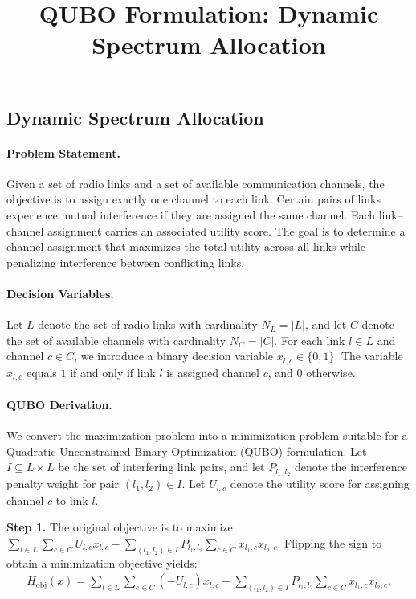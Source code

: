 \documentclass[12pt]{article}
\title{QUBO Formulation: Dynamic Spectrum Allocation}
\date{}
\begin{document}
\maketitle

\subsection*{Dynamic Spectrum Allocation}

\paragraph{Problem Statement.}
Given a set of radio links and a set of available communication channels, the objective is to assign exactly one channel to each link. Certain pairs of links experience mutual interference if they are assigned the same channel. Each link--channel assignment carries an associated utility score. The goal is to determine a channel assignment that maximizes the total utility across all links while penalizing interference between conflicting links.

\paragraph{Decision Variables.}
Let $L$ denote the set of radio links with cardinality $N_L = |L|$, and let $C$ denote the set of available channels with cardinality $N_C = |C|$. For each link $l \in L$ and channel $c \in C$, we introduce a binary decision variable $x_{l,c} \in \{0,1\}$. The variable $x_{l,c}$ equals $1$ if and only if link $l$ is assigned channel $c$, and $0$ otherwise.

\paragraph{QUBO Derivation.}
We convert the maximization problem into a minimization problem suitable for a Quadratic Unconstrained Binary Optimization (QUBO) formulation. Let $I \subseteq L \times L$ be the set of interfering link pairs, and let $P_{l_1, l_2}$ denote the interference penalty weight for pair $(l_1, l_2) \in I$. Let $U_{l,c}$ denote the utility score for assigning channel $c$ to link $l$.

\textbf{Step 1.} The original objective is to maximize $\sum_{l \in L} \sum_{c \in C} U_{l,c} x_{l,c} - \sum_{(l_1, l_2) \in I} P_{l_1, l_2} \sum_{c \in C} x_{l_1,c} x_{l_2,c}$. Flipping the sign to obtain a minimization objective yields:
\begin{align}
H_{\text{obj}}(x) = \sum_{l \in L} \sum_{c \in C} (-U_{l,c}) x_{l,c} + \sum_{(l_1, l_2) \in I} P_{l_1, l_2} \sum_{c \in C} x_{l_1,c} x_{l_2,c}.
\end{align}
\end{document}
